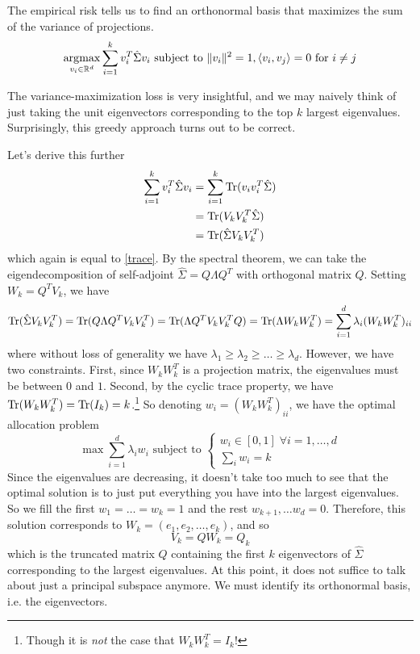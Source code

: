   \begin{theorem}
    The empirical risk tells us to find an orthonormal basis that maximizes the sum of the variance of projections. 
    \begin{equation}
      \operatorname*{\arg\!\max}_{v_i \in \mathbb{R}^d} \sum_{i=1}^k  v_i^T \hat{\Sigma} v_i \text{ subject to } \|v_i\|^2 = 1, \langle v_i, v_j \rangle = 0 \text{ for } i \neq j
    \end{equation}
  \end{theorem}

  The variance-maximization loss is very insightful, and we may naively think of just taking the unit eigenvectors corresponding to the top $k$ largest eigenvalues. Surprisingly, this greedy approach turns out to be correct. 

  Let's derive this further 
  \begin{align}
    \sum_{i = 1}^k v_i^T \hat{\Sigma} v_i 
    & = \sum_{i=1}^k \operatorname{Tr}(v_i v_i^T \hat{\Sigma}) \\ 
    & = \operatorname{Tr}(V_k V_k^T \hat{\Sigma}) \\ 
    & = \operatorname{Tr}(\hat{\Sigma} V_k V_k^T)
  \end{align}
  which again is equal to \ref{trace}. By the spectral theorem, we can take the eigendecomposition of self-adjoint $\hat{\Sigma} = Q \Lambda Q^T$ with orthogonal matrix $Q$. Setting $W_k = Q^T V_k$, we have 
  \begin{equation}
    \operatorname{Tr}(\hat{\Sigma} V_k V_k^T) = \operatorname{Tr}(Q \Lambda Q^T V_k V_k^T) = \operatorname{Tr}(\Lambda Q^T V_k V_k^T Q) = \operatorname{Tr}(\Lambda W_k W_k^T) = \sum_{i = 1}^d \lambda_i (W_k W_k^T)_{ii}
  \end{equation}
  where without loss of generality we have $\lambda_1 \geq \lambda_2 \geq \ldots \geq \lambda_d$. However, we have two constraints. First, since $W_k W_k^T$ is a projection matrix, the eigenvalues must be between $0$ and $1$. Second, by the cyclic trace property, we have $\operatorname{Tr}(W_k W_k^T) = \operatorname{Tr}(I_k) = k$.\footnote{Though it is \textit{not} the case that $W_k W_k^T = I_k$!} So denoting $w_i = (W_k W_k^T)_{ii}$, we have the optimal allocation problem 
  \begin{equation}
    \max \sum_{i=1}^d \lambda_i w_i \text{ subject to } \begin{cases} 
      w_i \in [0, 1] \; \forall i = 1, \ldots, d \\
      \sum_i w_i = k
    \end{cases}
  \end{equation}
  Since the eigenvalues are decreasing, it doesn't take too much to see that the optimal solution is to just put everything you have into the largest eigenvalues. So we fill the first $w_1 = \ldots = w_k = 1$ and the rest $w_{k+1}, \ldots w_d = 0$. Therefore, this solution corresponds to $W_k = (e_1, e_2, \ldots, e_k)$, and so 
  \begin{equation}
    V_k = Q W_k = Q_k
  \end{equation}
  which is the truncated matrix $Q$ containing the first $k$ eigenvectors of $\hat{\Sigma}$ corresponding to the largest eigenvalues. At this point, it does not suffice to talk about just a principal subspace anymore. We must identify its orthonormal basis, i.e. the eigenvectors. 

